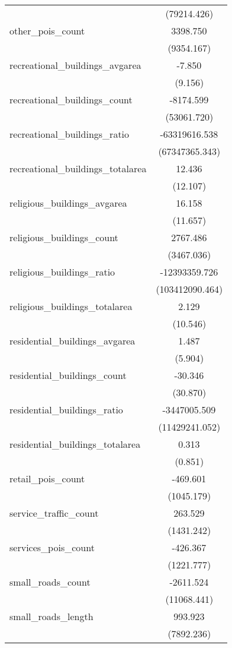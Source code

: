 \begin{table}[!htbp]
\begin{tabular}{@{\extracolsep{5pt}}lc}
  & (79214.426) \\
 other_pois_count & 3398.750$^{}$ \\
  & (9354.167) \\
 recreational_buildings_avgarea & -7.850$^{}$ \\
  & (9.156) \\
 recreational_buildings_count & -8174.599$^{}$ \\
  & (53061.720) \\
 recreational_buildings_ratio & -63319616.538$^{}$ \\
  & (67347365.343) \\
 recreational_buildings_totalarea & 12.436$^{}$ \\
  & (12.107) \\
 religious_buildings_avgarea & 16.158$^{}$ \\
  & (11.657) \\
 religious_buildings_count & 2767.486$^{}$ \\
  & (3467.036) \\
 religious_buildings_ratio & -12393359.726$^{}$ \\
  & (103412090.464) \\
 religious_buildings_totalarea & 2.129$^{}$ \\
  & (10.546) \\
 residential_buildings_avgarea & 1.487$^{}$ \\
  & (5.904) \\
 residential_buildings_count & -30.346$^{}$ \\
  & (30.870) \\
 residential_buildings_ratio & -3447005.509$^{}$ \\
  & (11429241.052) \\
 residential_buildings_totalarea & 0.313$^{}$ \\
  & (0.851) \\
 retail_pois_count & -469.601$^{}$ \\
  & (1045.179) \\
 service_traffic_count & 263.529$^{}$ \\
  & (1431.242) \\
 services_pois_count & -426.367$^{}$ \\
  & (1221.777) \\
 small_roads_count & -2611.524$^{}$ \\
  & (11068.441) \\
 small_roads_length & 993.923$^{}$ \\
  & (7892.236) \\

\end{tabular}
\end{table}
